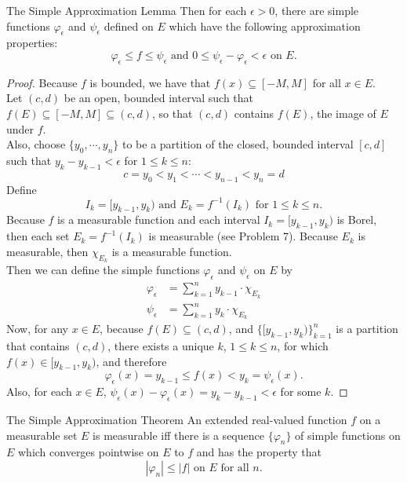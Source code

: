 \begin{flushleft}
\begin{namedthm*}{The Simple Approximation Lemma}
        Then for each $\epsilon>0$, there are simple functions $\varphi_\epsilon$ and $\psi_\epsilon$ defined on $E$ which have the following approximation properties:
        \[
            \varphi_\epsilon\le f\le\psi_\epsilon\text{ and }0\le\psi_\epsilon-\varphi_\epsilon<\epsilon\text{ on }E.    
        \]
    \end{namedthm*}
    \begin{proof}
        Because $f$ is bounded, we have that $f(x)\subseteq[-M,M]$ for all $x\in E$.
        \\Let $(c,d)$ be an open, bounded interval such that $f(E)\subseteq[-M,M]\subseteq(c,d)$, so that $(c,d)$ contains $f(E)$, the image of $E$ under $f$.
        \\Also, choose $\{y_0,\cdots,y_n\}$ to be a partition of the closed, bounded interval $[c,d]$ such that $y_k-y_{k-1}<\epsilon$ for $1\le k\le n$:
        \[
            c=y_0<y_1<\cdots<y_{n-1}<y_n=d
        \]
        Define 
        \[
            I_k=[y_{k-1},y_k)\text{ and }E_k=f^{-1}(I_k)\text{ for }1\le k \le n.
        \]
        Because $f$ is a measurable function and each interval $I_k=[y_{k-1},y_k)$ is Borel, then each set $E_k=f^{-1}(I_k)$ is measurable (see Problem 7).
        Because $E_k$ is measurable, then $\chi_{E_k}$ is a measurable function.
        \\Then we can define the simple functions $\varphi_\epsilon$ and $\psi_\epsilon$ on $E$ by
        \begin{align*}
            \varphi_\epsilon&=\sum_{k=1}^n y_{k-1}\cdot\chi_{E_k}\\
            \psi_\epsilon&=\sum_{k=1}^n y_k\cdot\chi_{E_k}
        \end{align*}
        Now, for any $x\in E$, because $f(E)\subseteq(c,d)$, and $\{[y_{k-1},y_k)\}_{k=1}^n$ is a partition that contains $(c,d)$, there exists a unique $k$, $1\le k\le n$, for which $f(x)\in[y_{k-1},y_k)$, and therefore
        \[
            \varphi_\epsilon(x)=y_{k-1}\le f(x)<y_k=\psi_\epsilon(x).    
        \]
        Also, for each $x\in E$, $\psi_\epsilon(x)-\varphi_\epsilon(x)=y_k-y_{k-1}<\epsilon$ for some $k$.
    \end{proof}
    \begin{namedthm*}{The Simple Approximation Theorem}
        An extended real-valued function $f$ on a measurable set $E$ is measurable iff there is a sequence $\{\varphi_n\}$ of simple functions on $E$ which converges pointwise on $E$ to $f$ and has the property that
        \[
            |\varphi_n|\le|f|\text{ on }E\text{ for all }n.
\]
\end{namedthm*}
\end{flushleft}
